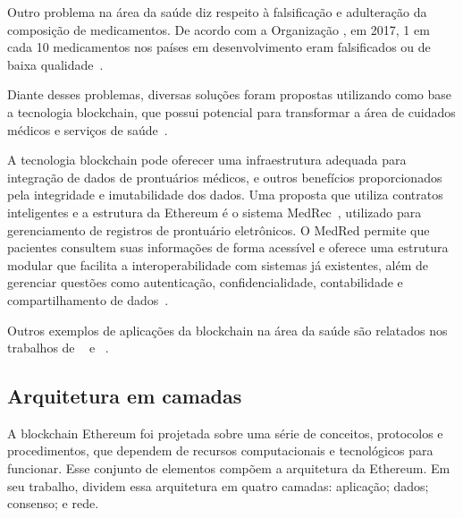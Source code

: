 Outro problema na área da saúde diz respeito à falsificação e adulteração da composição de medicamentos. De acordo com a Organização , em 2017, 1 em cada 10 medicamentos nos países em desenvolvimento eram falsificados ou de baixa qualidade~\cite{oms2017medicamentos}.

Diante desses problemas, diversas soluções foram propostas utilizando como base a tecnologia blockchain, que possui potencial para transformar a área de cuidados médicos e serviços de saúde~. 

A tecnologia blockchain pode oferecer uma infraestrutura adequada para integração de dados de prontuários médicos, e outros benefícios proporcionados pela integridade e imutabilidade dos dados. Uma proposta que utiliza contratos inteligentes e a estrutura da Ethereum é o sistema MedRec~\cite{ekblaw2016case-medrec}, utilizado para gerenciamento de registros de prontuário eletrônicos. O MedRed permite que pacientes consultem suas informações de forma acessível e oferece uma estrutura modular que facilita a interoperabilidade com sistemas já existentes, além de gerenciar questões como autenticação, confidencialidade, contabilidade e compartilhamento de dados~\cite{ekblaw2016case-medrec}.

Outros exemplos de aplicações da blockchain na área da saúde são relatados nos trabalhos de ~ e  ~.


\subsection{Arquitetura em camadas} \label{tex:fund:ethereum:camadas}


A blockchain Ethereum foi projetada sobre uma série de conceitos, protocolos e procedimentos, que dependem de recursos computacionais e tecnológicos para funcionar. Esse conjunto de elementos compõem a arquitetura da Ethereum. Em seu trabalho,  dividem essa arquitetura em quatro camadas: aplicação; dados; consenso; e rede. 

